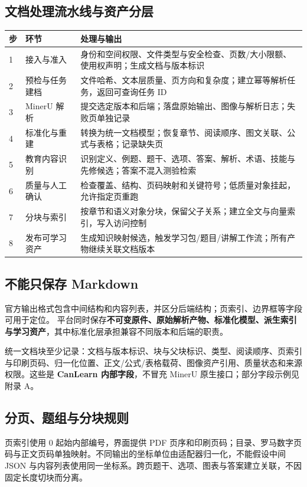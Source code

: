 \documentclass[UTF8,a4paper,11pt,fontset=none]{ctexart}
\newcommand{\cth}[1]{\textbf{\sffamily #1}}
\newenvironment{tbl}{\par\vspace{3pt}\small\noindent\ignorespaces}{\unskip\par\vspace{5pt}}
\begin{document}
\subsection{文档处理流水线与资产分层}
\begin{tbl}
\begin{tabularx}{\linewidth}{@{}C{9mm}L{28mm}Y@{}}
\toprule
\cth{步}&\cth{环节}&\cth{处理与输出}\\&接入与准入&身份和空间权限、文件类型与安全检查、页数/大小限额、使用权声明；生成文档与版本标识\\
2&预检与任务建档&文件哈希、文本层质量、页方向和复杂度；建立幂等解析任务，返回可查询任务 ID\\
3&MinerU 解析&提交选定版本和后端；落盘原始输出、图像与解析日志；失败页单独记录\\
4&标准化与重建&转换为统一文档模型；恢复章节、阅读顺序、图文关联、公式与表格；记录缺失页\\
5&教育内容识别&识别定义、例题、题干、选项、答案、解析、术语、技能与先修候选；答案不混入测验检索\\
6&质量与人工确认&检查覆盖、结构、页码映射和关键符号；低质量对象挂起，允许指定页重跑\\
7&分块与索引&按章节和语义对象分块，保留父子关系；建立全文与向量索引，写入访问控制\\
8&发布可学习资产&生成知识映射候选，触发学习包/题目/讲解工作流；所有产物继续关联文档版本\\
\bottomrule
\end{tabularx}
\end{tbl}

\subsection{不能只保存 Markdown}
官方输出格式包含中间结构和内容列表，并区分后端结构；页索引、边界框等字段可用于定位。\cite{mineru_output} 平台同时保存\textbf{不可变原件、原始解析产物、标准化模型、派生索引与学习资产}，其中标准化层承担兼容不同版本和后端的职责。

统一文档块至少记录：文档与版本标识、块与父块标识、类型、阅读顺序、页索引与印刷页码、归一化位置、正文/公式/表格载荷、图像资产引用、质量状态和来源权限。这些是 \textbf{CanLearn 内部字段}，不冒充 MinerU 原生接口；部分字段示例见附录 A。

\subsection{分页、题组与分块规则}
页索引使用 0 起始内部编号，界面提供 PDF 页序和印刷页码；目录、罗马数字页码与正文页码单独映射。不同输出的坐标单位由适配器归一化，不能假设中间 JSON 与内容列表使用同一坐标系。跨页题干、选项、图表与答案建立关联，不因固定长度切块而分离。\cite{mineru_output}
\end{document}
